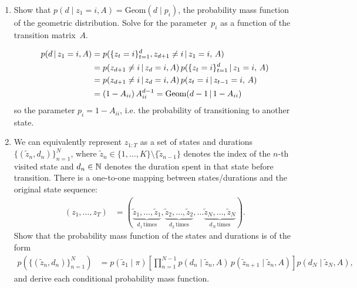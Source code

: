 \documentclass[11pt]{article}
\begin{document}
\begin{enumerate}[label=(\alph*)]
    \item Show that $p(d \mid z_1=i, A) = \mathrm{Geom}(d \mid p_i)$, the probability mass function of the geometric distribution.  Solve for the parameter~$p_i$ as a function of the transition matrix~$A$.
    
    \begin{solution}
    \begin{align*}
        p(d\,|\, z_1=i, A) &= p(\{z_t=i\}_{t=1}^d, z_{d+1}\neq i \,|\, z_1 =i,\, A) \\
            &= p(z_{d+1}\neq i \,|\, z_d=i, A)\, p(\{z_t=i\}_{t=1}^d \,|\, z_1 =i,\, A) \\
            &= p(z_{d+1}\neq i \,|\, z_d=i, A)\,  p(z_t =i \,|\, z_{t-1} =i,\, A) \\
            &= (1-A_{ii})\,A_{ii}^{d-1} = \textrm{Geom}(d-1 \,|\, 1-A_{ii})
    \end{align*}
    so the parameter $p_i = 1-A_{ii}$, i.e. the probability of transitioning to another state.
    \end{solution}
    
    \item We can equivalently represent $z_{1:T}$ as a set of states and durations~$\{(\tilde{z}_n, d_n)\}_{n=1}^N$, where $\tilde{z}_n \in \{1, \ldots, K\} \setminus \{\tilde{z}_{n-1}\}$ denotes the index of the $n$-th visited state and $d_n \in \mathbb{N}$ denotes the duration spent in that state before transition.  There is a one-to-one mapping between states/durations and the original state sequence:
    \begin{align*}
        (z_1, \ldots, z_T) &= (\underbrace{\tilde{z}_1, \ldots, \tilde{z}_1}_{d_1\,\mathrm{times}}, \underbrace{\tilde{z}_2, \ldots, \tilde{z}_2}_{d_2\,\mathrm{times}}, \ldots \underbrace{\tilde{z}_N, \ldots, \tilde{z}_N}_{d_N\,\mathrm{times}}).
    \end{align*}
    Show that the probability mass function of the states and durations is of the form
    \begin{align*}
        p(\{(\tilde{z}_n, d_n)\}_{n=1}^N) &= p(\tilde{z}_1 \mid \pi) \left[ \prod_{n=1}^{N-1} p(d_n \mid \tilde{z}_n, A) \, p(\tilde{z}_{n+1} \mid \tilde{z}_n, A) \right] p(d_N \mid \tilde{z}_N, A),
    \end{align*}
    and derive each conditional probability mass function.
    

\end{enumerate}
\end{document}

